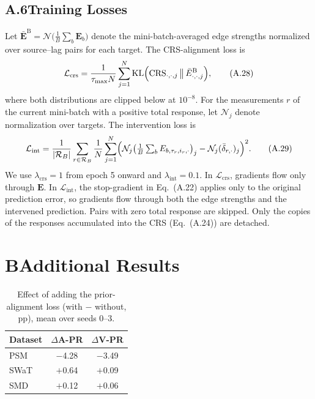 \documentclass[letterpaper]{article}
\newcommand{\CRS}{\mathrm{CRS}}
\begin{document}
\subsection{A.6\quad Training Losses}

Let $\bar{\mathbf{E}}^{\mathrm{B}}=\mathcal{N}\bigl(\frac{1}{B}\sum_{b}\mathbf{E}_b\bigr)$ denote the mini-batch-averaged edge strengths normalized over source--lag pairs for each target. The CRS-alignment loss is
\begin{equation}
\mathcal{L}_{\mathrm{crs}}=\frac{1}{\tau_{\max}N}\sum_{j=1}^{N}\mathrm{KL}\Bigl(\CRS_{\cdot,\cdot,j}\,\big\|\,\bar{E}^{\mathrm{B}}_{\cdot,\cdot,j}\Bigr),
\tag{A.28}
\end{equation}
where both distributions are clipped below at $10^{-8}$. For the measurements $r$ of the current mini-batch with a positive total response, let $\mathcal{N}_j$ denote normalization over targets. The intervention loss is
\begin{equation}
\mathcal{L}_{\mathrm{int}}=\frac{1}{|\mathcal{R}_B|}\sum_{r\in\mathcal{R}_B}\frac{1}{N}\sum_{j=1}^{N}\Bigl(\mathcal{N}_j\bigl(\textstyle\frac{1}{B}\sum_b E_{b,\tau_r,i_r,\cdot}\bigr)_j-\mathcal{N}_j(\bar{\delta}_{r,\cdot})_j\Bigr)^2 .
\tag{A.29}
\end{equation}
We use $\lambda_{\mathrm{crs}}=1$ from epoch 5 onward and $\lambda_{\mathrm{int}}=0.1$. In $\mathcal{L}_{\mathrm{crs}}$, gradients flow only through $\mathbf{E}$. In $\mathcal{L}_{\mathrm{int}}$, the stop-gradient in Eq.~(A.22) applies only to the original prediction error, so gradients flow through both the edge strengths and the intervened prediction. Pairs with zero total response are skipped. Only the copies of the responses accumulated into the CRS (Eq.~(A.24)) are detached.

\section{B\quad Additional Results}

\begin{table}[h]
\centering
\caption{Effect of adding the prior-alignment loss (with $-$ without, pp), mean over seeds 0--3.}
\small
\begin{tabular}{lcc}
\toprule
Dataset & $\Delta$A-PR & $\Delta$V-PR \\
\midrule
PSM  & $-$4.28 & $-$3.49 \\
SWaT & $+$0.64 & $+$0.09 \\
SMD  & $+$0.12 & $+$0.06 \\
\bottomrule
\end{tabular}
\end{table}
\end{document}
